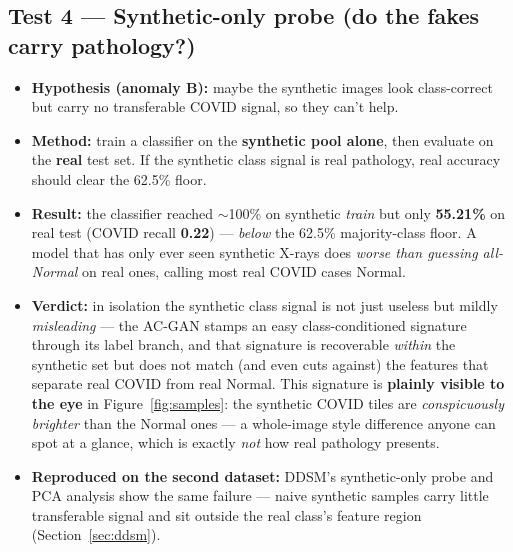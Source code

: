 \documentclass[11pt]{article}
\begin{document}
\subsection{Test 4 --- Synthetic-only probe (do the fakes carry pathology?)}
\begin{itemize}[nosep,leftmargin=1.4em]
  \item \textbf{Hypothesis (anomaly B):} maybe the synthetic images look
        class-correct but carry no transferable COVID signal, so they can't help.
  \item \textbf{Method:} train a classifier on the \textbf{synthetic pool alone},
        then evaluate on the \textbf{real} test set. If the synthetic class signal
        is real pathology, real accuracy should clear the 62.5\% floor.
  \item \textbf{Result:} the classifier reached $\sim$100\% on synthetic
        \emph{train} but only \textbf{55.21\%} on real test (COVID recall
        \textbf{0.22}) --- \emph{below} the 62.5\% majority-class floor. A model
        that has only ever seen synthetic X-rays does \emph{worse than guessing
        all-Normal} on real ones, calling most real COVID cases Normal.
  \item \textbf{Verdict:} in isolation the synthetic class signal is not just
        useless but mildly \emph{misleading} --- the AC-GAN stamps an easy
        class-conditioned signature through its label branch, and that signature is
        recoverable \emph{within} the synthetic set but does not match (and even
        cuts against) the features that separate real COVID from real Normal. This
        signature is \textbf{plainly visible to the eye} in Figure~\ref{fig:samples}:
        the synthetic COVID tiles are \emph{conspicuously brighter} than the Normal
        ones --- a whole-image style difference anyone can spot at a glance, which is
        exactly \emph{not} how real pathology presents.
  \item \textbf{Reproduced on the second dataset:} DDSM's synthetic-only probe and
        PCA analysis show the same failure --- naive synthetic samples carry little
        transferable signal and sit outside the real class's feature region
        (Section~\ref{sec:ddsm}).
\end{itemize}
\end{document}
